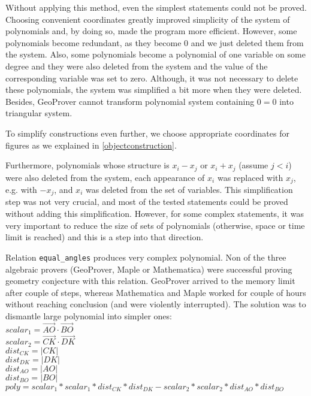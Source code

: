 \documentclass[final,1p,times,authoryear]{elsarticle}
\begin{document}
Without applying this method, even the simplest statements could not
be proved. Choosing convenient coordinates greatly improved simplicity
of the system of polynomials and, by doing so, made the program more
efficient. However, some polynomials become redundant, as they become
$0$ and we just deleted them from the system. Also, some polynomials
become a polynomial of one variable on some degree and they were also
deleted from the system and the value of the corresponding variable
was set to zero. Although, it was not necessary to delete these
polynomials, the system was simplified a bit more when they were
deleted. Besides, GeoProver cannot transform polynomial system
containing $0 = 0$ into triangular system.

To simplify constructions even further, we choose appropriate
coordinates for figures as we explained in \ref{objectconstruction}.

Furthermore, polynomials whose structure is $x_i - x_j$ or $x_i + x_j$
(assume $j < i$) were also deleted from the system, each appearance of
$x_i$ was replaced with $x_j$, e.g. with $-x_j$, and $x_i$ was deleted
from the set of variables. This simplification step was not very
crucial, and most of the tested statements could be proved without
adding this simplification. However, for some complex statements, it
was very important to reduce the size of sets of polynomials
(otherwise, space or time limit is reached) and this is a step into
that direction.

Relation {\tt equal\_angles} produces very complex polynomial. Non of
the three algebraic provers (GeoProver, Maple or Mathematica) were
successful proving geometry conjecture with this relation. GeoProver
arrived to the memory limit after couple of steps, whereas Mathematica
and Maple worked for couple of hours without reaching conclusion (and
were violently interrupted). The solution was to dismantle large
polynomial into simpler ones: \\
$scalar_1 = \overrightarrow{AO}\cdot\overrightarrow{BO}$ \\
$scalar_2 = \overrightarrow{CK}\cdot\overrightarrow{DK}$ \\
$dist_{CK} = |CK|$ \\
$dist_{DK} = |DK|$ \\
$dist_{AO} = |AO|$ \\
$dist_{BO} = |BO|$ \\
$poly = scalar_1 * scalar_1 * dist_{CK} * dist_{DK} - scalar_2 * scalar_2 * dist_{AO} * dist_{BO}$ \\
\end{document}
